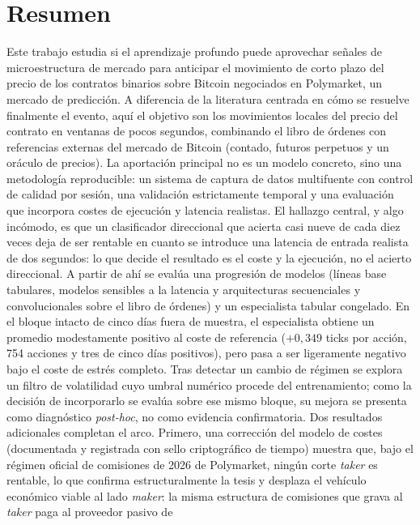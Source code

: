 \newpage
\section*{Resumen}
\label{sec::resumen}

Este trabajo estudia si el aprendizaje profundo puede aprovechar señales de
microestructura de mercado para anticipar el movimiento de corto plazo del precio de los
contratos binarios sobre Bitcoin negociados en Polymarket, un mercado de predicción. A
diferencia de la literatura centrada en cómo se resuelve finalmente el evento, aquí el
objetivo son los movimientos locales del precio del contrato en ventanas de pocos
segundos, combinando el libro de órdenes con referencias externas del mercado de Bitcoin
(contado, futuros perpetuos y un oráculo de precios). La aportación principal no es un
modelo concreto, sino una metodología reproducible: un sistema de captura de datos
multifuente con control de calidad por sesión, una validación estrictamente temporal y una
evaluación que incorpora costes de ejecución y latencia realistas. El hallazgo central, y
algo incómodo, es que un clasificador direccional que acierta casi nueve de cada diez veces
deja de ser rentable en cuanto se introduce una latencia de entrada realista de dos
segundos: lo que decide el resultado es el coste y la ejecución, no el acierto direccional.
A partir de ahí se evalúa una progresión de modelos (líneas base tabulares, modelos
sensibles a la latencia y arquitecturas secuenciales y convolucionales sobre el libro de
órdenes) y un especialista tabular congelado. En el bloque intacto de cinco días fuera de
muestra, el especialista obtiene un promedio modestamente positivo al coste de referencia
($+0{,}349$ ticks por acción, 754 acciones y tres de cinco días positivos), pero pasa a ser
ligeramente negativo bajo el coste de estrés completo. Tras detectar un cambio de régimen se
explora un filtro de volatilidad cuyo umbral numérico procede del entrenamiento; como la
decisión de incorporarlo se evalúa sobre ese mismo bloque, su mejora se presenta como
diagnóstico \emph{post-hoc}, no como evidencia confirmatoria. Dos resultados adicionales
completan el arco. Primero, una corrección del modelo de costes (documentada y registrada con sello
criptográfico de tiempo) muestra que, bajo el régimen oficial de
comisiones de 2026 de Polymarket, ningún corte \emph{taker} es rentable, lo que confirma
estructuralmente la tesis y desplaza el vehículo económico viable al lado \emph{maker}: la
misma estructura de comisiones que grava al \emph{taker} paga al proveedor pasivo de
